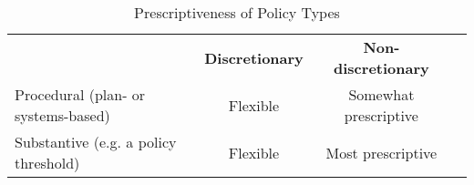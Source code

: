 \begin{table}
\caption{Prescriptiveness of Policy Types}
\label{prescriptiveness}

\renewcommand{\arraystretch}{1.5} 
\small
\centering

\begin{tabular}{lccc}
 & \textbf{Discretionary} & \textbf{Non-discretionary} \\
 \cline{2-3} 
Procedural (plan- or systems-based) & Flexible & Somewhat prescriptive \\
 \cline{2-3} 
Substantive (e.g. a policy threshold) & Flexible & Most prescriptive \\
 \cline{2-3} 
\end{tabular}

\end{table}